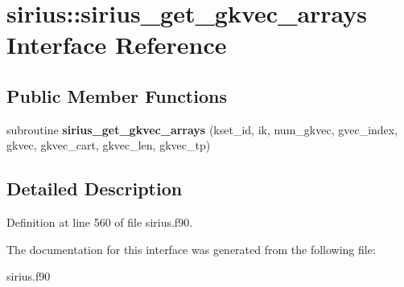 \hypertarget{interfacesirius_1_1sirius__get__gkvec__arrays}{}\section{sirius\+:\+:sirius\+\_\+get\+\_\+gkvec\+\_\+arrays Interface Reference}
\label{interfacesirius_1_1sirius__get__gkvec__arrays}
\subsection*{Public Member Functions}
\begin{DoxyCompactItemize}
\item 
\hypertarget{interfacesirius_1_1sirius__get__gkvec__arrays_aad5a1267993087d312d1a8da64ecf02f}{}subroutine {\bfseries sirius\+\_\+get\+\_\+gkvec\+\_\+arrays} (kset\+\_\+id, ik, num\+\_\+gkvec, gvec\+\_\+index, gkvec, gkvec\+\_\+cart, gkvec\+\_\+len, gkvec\+\_\+tp)\label{interfacesirius_1_1sirius__get__gkvec__arrays_aad5a1267993087d312d1a8da64ecf02f}

\end{DoxyCompactItemize}


\subsection{Detailed Description}


Definition at line 560 of file sirius.\+f90.



The documentation for this interface was generated from the following file\+:\begin{DoxyCompactItemize}
\item 
sirius.\+f90\end{DoxyCompactItemize}
